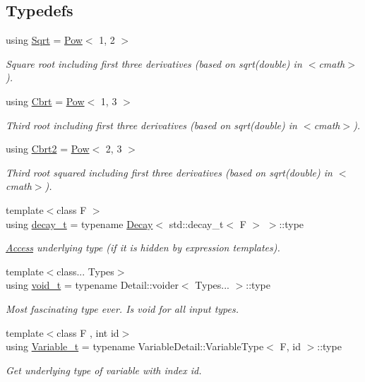 \subsection*{Typedefs}
\begin{DoxyCompactItemize}
\item 
using \hyperlink{group__CMathGroup_gaca80e773d5886f47cd49dc19b130263f}{Sqrt} = \hyperlink{structFunG_1_1Pow}{Pow}$<$ 1, 2 $>$
\begin{DoxyCompactList}\small\item\em Square root including first three derivatives (based on sqrt(double) in $<$cmath$>$). \end{DoxyCompactList}\item 
using \hyperlink{group__CMathGroup_ga2e4363ad8400e1c8431c10de2152ec2b}{Cbrt} = \hyperlink{structFunG_1_1Pow}{Pow}$<$ 1, 3 $>$
\begin{DoxyCompactList}\small\item\em Third root including first three derivatives (based on sqrt(double) in $<$cmath$>$). \end{DoxyCompactList}\item 
using \hyperlink{group__CMathGroup_ga9bcbef859d7ffd0d6570d69e1bd8503a}{Cbrt2} = \hyperlink{structFunG_1_1Pow}{Pow}$<$ 2, 3 $>$
\begin{DoxyCompactList}\small\item\em Third root squared including first three derivatives (based on sqrt(double) in $<$cmath$>$). \end{DoxyCompactList}\item 
{\footnotesize template$<$class F $>$ }\\using \hyperlink{namespaceFunG_a195ac37d8696970c89b112c81a1e4d6e}{decay\+\_\+t} = typename \hyperlink{structFunG_1_1Decay}{Decay}$<$ std\+::decay\+\_\+t$<$ F $>$ $>$\+::type
\begin{DoxyCompactList}\small\item\em \hyperlink{namespaceFunG_1_1Access}{Access} underlying type (if it is hidden by expression templates). \end{DoxyCompactList}\item 
{\footnotesize template$<$class... Types$>$ }\\using \hyperlink{namespaceFunG_a0cde667596590eb8d32e4a5ee76ddbb9}{void\+\_\+t} = typename Detail\+::voider$<$ Types... $>$\+::type
\begin{DoxyCompactList}\small\item\em Most fascinating type ever. Is void for all input types. \end{DoxyCompactList}\item 
{\footnotesize template$<$class F , int id$>$ }\\using \hyperlink{namespaceFunG_a3d589ef7d011a46a72847eabcbbb4532}{Variable\+\_\+t} = typename Variable\+Detail\+::\+Variable\+Type$<$ F, id $>$\+::type
\begin{DoxyCompactList}\small\item\em Get underlying type of variable with index id. \end{DoxyCompactList}\end{DoxyCompactItemize}
